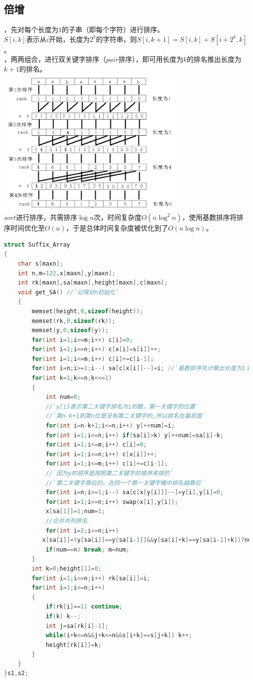 \documentclass[a4paper]{book}
\begin{document}
\subsection{倍增}
，先对每个长度为$1$的子串（即每个字符）进行排序。\\
\indent$S[i,k]$表示从$i$开始，长度为$2^k$的字符串，则$S[i,k+1]=S[i,k]+S[i+2^k,k]$。\\
，两两组合，进行双关键字排序（$pair$排序），即可用长度为$k$的排名推出长度为$k+1$的排名。\\
\includegraphics[width=0.7\textwidth,center]{../photo/sa2}\\
$sort$进行排序，共需排序$\log n$次，时间复杂度$O(n\log ^2n)$，使用基数排序将排序时间优化至$O(n)$，于是总体时间复杂度被优化到了$O(n\log n)$。
\begin{lstlisting}[language=c++,escapeinside=``]
struct Suffix_Array
{
    char s[maxn];
    int n,m=122,x[maxn],y[maxn];
    int rk[maxn],sa[maxn],height[maxn],c[maxn];
    void get_SA() //`记得对n初始化`
    {
        memset(height,0,sizeof(height));
        memset(rk,0,sizeof(rk));
        memset(y,0,sizeof(y));
        for(int i=1;i<=m;i++) c[i]=0;
        for(int i=1;i<=n;i++) c[x[i]=s[i]]++;
        for(int i=1;i<=m;i++) c[i]+=c[i-1];
        for(int i=n;i>=1;i--) sa[c[x[i]]--]=i; //`基数排序先计算出长度为1子串的顺序`
        for(int k=1;k<=n;k<<=1)
        {
            int num=0;
            //`y[i]表示第二关键字排名为i的数，第一关键字的位置`
            //`第n-k+1到第n位是没有第二关键字的,所以排名在最前面`
            for(int i=n-k+1;i<=n;i++) y[++num]=i; 
            for(int i=1;i<=n;i++) if(sa[i]>k) y[++num]=sa[i]-k;
            for(int i=1;i<=m;i++) c[i]=0;
            for(int i=1;i<=n;i++) c[x[i]]++;
            for(int i=1;i<=m;i++) c[i]+=c[i-1];
            //`因为y的顺序是按照第二关键字的顺序来排的`
            //`第二关键字靠后的，在同一个第一关键字桶中排名越靠后`
            for(int i=n;i>=1;i--) sa[c[x[y[i]]]--]=y[i],y[i]=0;
            for(int i=1;i<=n;i++) swap(x[i],y[i]);
            x[sa[1]]=1;num=1; 
            //合并并列排名
            for(int i=2;i<=n;i++) 
           x[sa[i]]=(y[sa[i]]==y[sa[i-1]]&&y[sa[i]+k]==y[sa[i-1]+k])?num:++num;
            if(num==n) break; m=num;
        }
        int k=0;height[1]=0;
        for(int i=1;i<=n;i++) rk[sa[i]]=i;
        for(int i=1;i<=n;i++)
        {	
            if(rk[i]==1) continue;
            if(k) k--;
            int j=sa[rk[i]-1];
            while(i+k<=n&&j+k<=n&&s[i+k]==s[j+k]) k++;
            height[rk[i]]=k;
        }
    }
}s1,s2;
\end{lstlisting}
\end{document}
